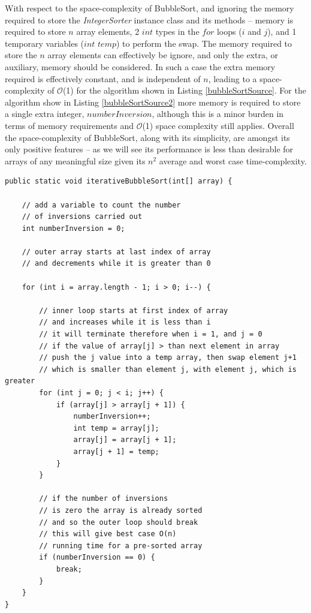 \documentclass[12pt,a4paper]{article}
\begin{document}
With respect to the space-complexity of BubbleSort, and ignoring the memory required to store the \emph{IntegerSorter} instance class and its methods -- memory is required to store $n$ array elements, 2 $int$ types in the $for$ loops ($i$ and $j$), and 1 temporary variables ($int$ $temp$) to perform the swap. The memory required to store the $n$ array elements can effectively be ignore, and only the extra, or auxiliary, memory should be considered. In such a case the extra memory required is effectively constant, and is independent of $n$, leading to a space-complexity of $\mathcal{O}$(1) for the algorithm shown in Listing \ref{bubbleSortSource}. For the algorithm show in Listing \ref{bubbleSortSource2} more memory is required to store a single extra integer, $numberInversion$, although this is a minor burden in terms of memory requirements and $\mathcal{O}$(1) space complexity still applies. Overall the space-complexity of BubbleSort, along with its simplicity, are amongst its only positive features -- as we will see its performance is less than desirable for arrays of any meaningful size given its $n^2$ average and worst case time-complexity.

\clearpage

\begin{lstlisting}[caption={Modification of the iterative bubble sort algorithm \cite{mannionBubbleSort} to account for a best case scenario where no inversions are present.},captionpos=b, label={bubbleSortSource2}]
public static void iterativeBubbleSort(int[] array) {

	// add a variable to count the number
	// of inversions carried out
	int numberInversion = 0;

	// outer array starts at last index of array
	// and decrements while it is greater than 0
	
	for (int i = array.length - 1; i > 0; i--) {

		// inner loop starts at first index of array
		// and increases while it is less than i
		// it will terminate therefore when i = 1, and j = 0
		// if the value of array[j] > than next element in array
		// push the j value into a temp array, then swap element j+1
		// which is smaller than element j, with element j, which is greater
		for (int j = 0; j < i; j++) {
			if (array[j] > array[j + 1]) {
				numberInversion++;
				int temp = array[j];
				array[j] = array[j + 1];
				array[j + 1] = temp;
			}
		}

		// if the number of inversions
		// is zero the array is already sorted
		// and so the outer loop should break
		// this will give best case O(n)
		// running time for a pre-sorted array
		if (numberInversion == 0) {
			break;
		}
	}
}
\end{lstlisting}
\end{document}
